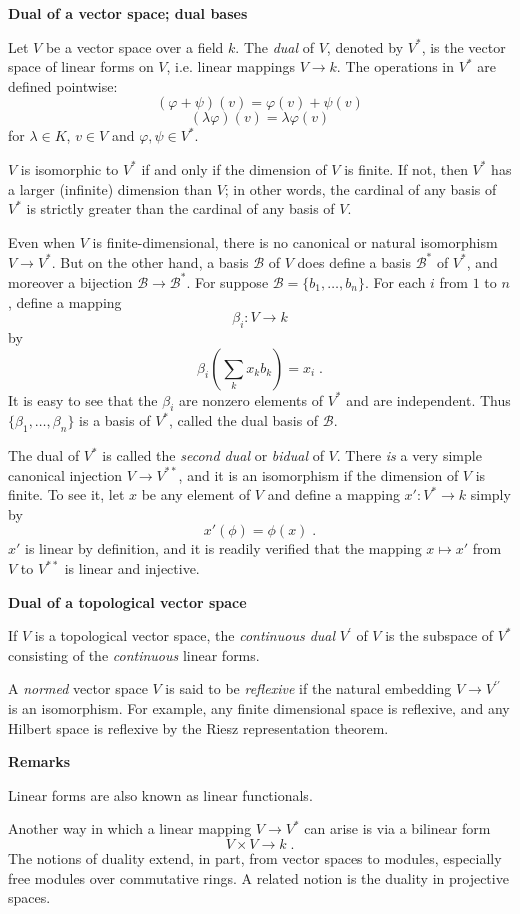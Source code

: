 \documentclass[12pt]{article}
\begin{document}
\newcommand{\B}{\mathcal{B}}
\newcommand{\Bstar}{\mathcal{B}^\ast}
\newcommand{\Vstar}{V^{\ast}}
\newcommand{\Vstarstar}{V^{\ast\ast}}

\textbf{Dual of a vector space; dual bases}

Let $V$ be a vector space over a field $k$. The \emph{dual} of $V$,
denoted by $\Vstar$, is the vector space of linear forms on $V$, i.e.
linear mappings $V\to k$.
The operations in $\Vstar$ are defined pointwise:
$$(\varphi + \psi )(v) = \varphi (v) + \psi (v) $$
$$(\lambda\varphi )(v) = \lambda\varphi (v)$$
for $\lambda\in K$, $v\in V$ and $\varphi,\psi\in\Vstar$.

$V$ is isomorphic to $\Vstar$ if and only if the dimension of
$V$ is finite. If not, then $\Vstar$ has a larger (infinite)
dimension than $V$; in other words, the cardinal of any basis
of $\Vstar$ is strictly greater than the cardinal of any basis of $V$.

Even when $V$ is finite-dimensional, there is no canonical or natural
isomorphism $V\to\Vstar$. But on the other hand, a basis
$\B$ of $V$ does define a basis $\Bstar$ of $\Vstar$, and moreover a
bijection $\B\to\Bstar$. For suppose
$\B=\{b_1,\dots,b_n\}$. For each $i$ from $1$ to $n$, define a mapping
$$\beta_i:V\to k$$
by
$$\beta_i(\sum_k x_k b_k)=x_i\;.$$
It is easy to see that the $\beta_i$ are nonzero elements of $\Vstar$
and are independent. Thus $\{\beta_1,\dots,\beta_n\}$ is a basis of
$\Vstar$, called the dual basis of $\B$.

The dual of $\Vstar$ is called the \emph{second dual} or \emph{bidual} of $V$.
There \emph{is} a very simple canonical injection $V\to\Vstarstar$,
and it is an isomorphism if the dimension of $V$ is finite.
To see it, let $x$ be any element of $V$ and define a mapping $x':\Vstar\to k$
simply by
$$x'(\phi)=\phi(x)\;.$$
$x'$ is linear by definition, and it is readily verified that the mapping
$x\mapsto x'$ from $V$ to $\Vstarstar$ is linear and injective.

\textbf{Dual of a topological vector space}

If $V$ is a topological vector space, the \emph{continuous dual}
$V^{\prime}$ of $V$ is the subspace of $\Vstar$ consisting of
the \emph{continuous} linear forms.

A \emph{normed} vector space $V$ is said to be \emph{reflexive} if the natural
embedding $V\to V^{\prime\prime}$ is an isomorphism. For example,
any finite dimensional space is reflexive, and any Hilbert space is
reflexive by the Riesz representation theorem.

\textbf{Remarks}

Linear forms are also known as linear functionals. 

Another way in which a linear mapping $V\to\Vstar$ can arise is via
a bilinear form $$V \times V \to k\;.$$
The notions of duality extend, in part, from vector spaces to modules,
especially free modules over commutative rings. A related notion is
the duality in projective spaces.
\end{document}
